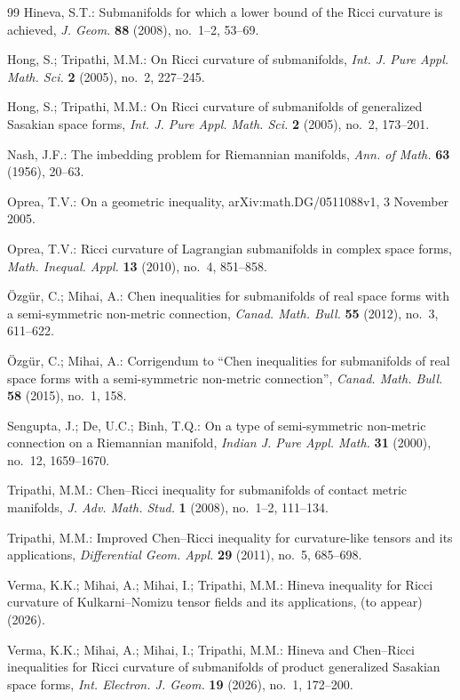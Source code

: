 \documentclass[11pt]{article}
\theoremstyle{definition}
\begin{document}
\begin{thebibliography}{99}
 Hineva, S.T.: Submanifolds for which a lower bound of the Ricci curvature is achieved, \emph{J. Geom.} \textbf{88} (2008), no.\ 1--2, 53--69.

 Hong, S.; Tripathi, M.M.: On Ricci curvature of submanifolds, \emph{Int. J. Pure Appl. Math. Sci.} \textbf{2} (2005), no.\ 2, 227--245.

 Hong, S.; Tripathi, M.M.: On Ricci curvature of submanifolds of generalized Sasakian space forms, \emph{Int. J. Pure Appl. Math. Sci.} \textbf{2} (2005), no.\ 2, 173--201.

 Nash, J.F.: The imbedding problem for Riemannian manifolds, \emph{Ann. of Math.} \textbf{63} (1956), 20--63.

 Oprea, T.V.: On a geometric inequality, arXiv:math.DG/0511088v1, 3 November 2005.

 Oprea, T.V.: Ricci curvature of Lagrangian submanifolds in complex space forms, \emph{Math. Inequal. Appl.} \textbf{13} (2010), no.\ 4, 851--858.

 \"Ozg\"ur, C.; Mihai, A.: Chen inequalities for submanifolds of real space forms with a semi-symmetric non-metric connection, \emph{Canad. Math. Bull.} \textbf{55} (2012), no.\ 3, 611--622.

 \"Ozg\"ur, C.; Mihai, A.: Corrigendum to ``Chen inequalities for submanifolds of real space forms with a semi-symmetric non-metric connection'', \emph{Canad. Math. Bull.} \textbf{58} (2015), no.\ 1, 158.

 Sengupta, J.; De, U.C.; Binh, T.Q.: On a type of semi-symmetric non-metric connection on a Riemannian manifold, \emph{Indian J. Pure Appl. Math.} \textbf{31} (2000), no.\ 12, 1659--1670.

 Tripathi, M.M.: Chen--Ricci inequality for submanifolds of contact metric manifolds, \emph{J. Adv. Math. Stud.} \textbf{1} (2008), no.\ 1--2, 111--134.

 Tripathi, M.M.: Improved Chen--Ricci inequality for curvature-like tensors and its applications, \emph{Differential Geom. Appl.} \textbf{29} (2011), no.\ 5, 685--698.

 Verma, K.K.; Mihai, A.; Mihai, I.; Tripathi, M.M.: Hineva inequality for Ricci curvature of Kulkarni--Nomizu tensor fields and its applications, (to appear) (2026).

 Verma, K.K.; Mihai, A.; Mihai, I.; Tripathi, M.M.: Hineva and Chen--Ricci inequalities for Ricci curvature of submanifolds of product generalized Sasakian space forms, \emph{Int. Electron. J. Geom.} \textbf{19} (2026), no.\ 1, 172--200.

\end{thebibliography}
\end{document}
